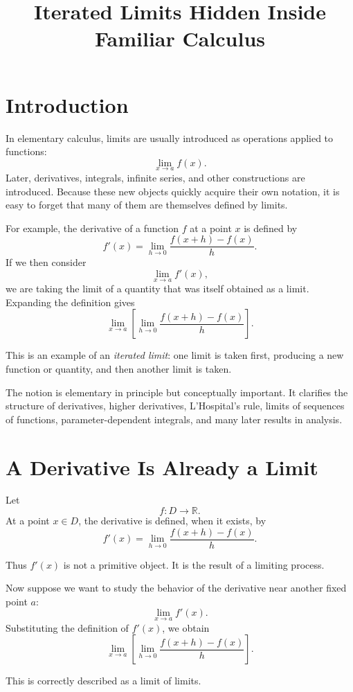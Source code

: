 \documentclass{essay}
\title{Iterated Limits Hidden Inside Familiar Calculus}
\author{}
\date{}
\begin{document}
\maketitle

\section{Introduction}

In elementary calculus, limits are usually introduced as operations applied to functions:
\[ \lim_{x\to a} f(x). \]
Later, derivatives, integrals, infinite series, and other constructions are introduced. Because these new objects quickly acquire their own notation, it is easy to forget that many of them are themselves defined by limits.

For example, the derivative of a function \(f\) at a point \(x\) is defined by
\[ f'(x) = \lim_{h\to 0} \frac{f(x+h)-f(x)}{h}. \]
If we then consider
\[ \lim_{x\to a} f'(x), \]
we are taking the limit of a quantity that was itself obtained as a limit. Expanding the definition gives
\[ \lim_{x\to a} \left[ \lim_{h\to 0} \frac{f(x+h)-f(x)}{h} \right]. \]

This is an example of an \emph{iterated limit}: one limit is taken first, producing a new function or quantity, and then another limit is taken.

The notion is elementary in principle but conceptually important. It clarifies the structure of derivatives, higher derivatives, L'Hospital's rule, limits of sequences of functions, parameter-dependent integrals, and many later results in analysis.

\section{A Derivative Is Already a Limit}

Let
\[ f:D\to\mathbb{R}. \]
At a point \(x\in D\), the derivative is defined, when it exists, by
\[ f'(x) = \lim_{h\to 0} \frac{f(x+h)-f(x)}{h}. \]

Thus \(f'(x)\) is not a primitive object. It is the result of a limiting process.

Now suppose we want to study the behavior of the derivative near another fixed point \(a\):
\[ \lim_{x\to a} f'(x). \]
Substituting the definition of \(f'(x)\), we obtain
\[ \boxed{ \lim_{x\to a} \left[ \lim_{h\to 0} \frac{f(x+h)-f(x)}{h} \right]. } \]

This is correctly described as a limit of limits.
\end{document}

